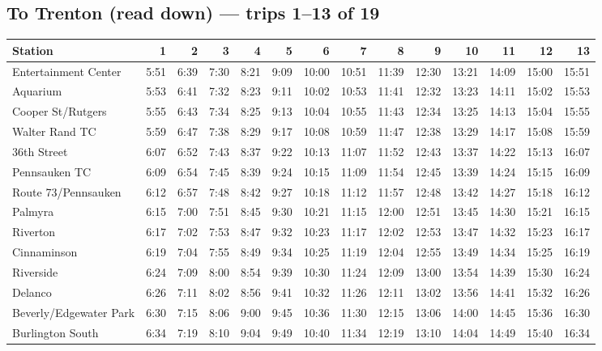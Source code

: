 \subsection*{To Trenton (read down) --- trips 1--13 of 19}
\begin{center}\footnotesize\setlength{\tabcolsep}{3pt}\begin{tabular}{@{}lrrrrrrrrrrrrr@{}}\toprule
Station & 1 & 2 & 3 & 4 & 5 & 6 & 7 & 8 & 9 & 10 & 11 & 12 & 13 \\\midrule
Entertainment Center & 5:51 & 6:39 & 7:30 & 8:21 & 9:09 & 10:00 & 10:51 & 11:39 & 12:30 & 13:21 & 14:09 & 15:00 & 15:51 \\
Aquarium & 5:53 & 6:41 & 7:32 & 8:23 & 9:11 & 10:02 & 10:53 & 11:41 & 12:32 & 13:23 & 14:11 & 15:02 & 15:53 \\
Cooper St/Rutgers & 5:55 & 6:43 & 7:34 & 8:25 & 9:13 & 10:04 & 10:55 & 11:43 & 12:34 & 13:25 & 14:13 & 15:04 & 15:55 \\
Walter Rand TC & 5:59 & 6:47 & 7:38 & 8:29 & 9:17 & 10:08 & 10:59 & 11:47 & 12:38 & 13:29 & 14:17 & 15:08 & 15:59 \\
36th Street & 6:07 & 6:52 & 7:43 & 8:37 & 9:22 & 10:13 & 11:07 & 11:52 & 12:43 & 13:37 & 14:22 & 15:13 & 16:07 \\
Pennsauken TC & 6:09 & 6:54 & 7:45 & 8:39 & 9:24 & 10:15 & 11:09 & 11:54 & 12:45 & 13:39 & 14:24 & 15:15 & 16:09 \\
Route 73/Pennsauken & 6:12 & 6:57 & 7:48 & 8:42 & 9:27 & 10:18 & 11:12 & 11:57 & 12:48 & 13:42 & 14:27 & 15:18 & 16:12 \\
Palmyra & 6:15 & 7:00 & 7:51 & 8:45 & 9:30 & 10:21 & 11:15 & 12:00 & 12:51 & 13:45 & 14:30 & 15:21 & 16:15 \\
Riverton & 6:17 & 7:02 & 7:53 & 8:47 & 9:32 & 10:23 & 11:17 & 12:02 & 12:53 & 13:47 & 14:32 & 15:23 & 16:17 \\
Cinnaminson & 6:19 & 7:04 & 7:55 & 8:49 & 9:34 & 10:25 & 11:19 & 12:04 & 12:55 & 13:49 & 14:34 & 15:25 & 16:19 \\
Riverside & 6:24 & 7:09 & 8:00 & 8:54 & 9:39 & 10:30 & 11:24 & 12:09 & 13:00 & 13:54 & 14:39 & 15:30 & 16:24 \\
Delanco & 6:26 & 7:11 & 8:02 & 8:56 & 9:41 & 10:32 & 11:26 & 12:11 & 13:02 & 13:56 & 14:41 & 15:32 & 16:26 \\
Beverly/Edgewater Park & 6:30 & 7:15 & 8:06 & 9:00 & 9:45 & 10:36 & 11:30 & 12:15 & 13:06 & 14:00 & 14:45 & 15:36 & 16:30 \\
Burlington South & 6:34 & 7:19 & 8:10 & 9:04 & 9:49 & 10:40 & 11:34 & 12:19 & 13:10 & 14:04 & 14:49 & 15:40 & 16:34 \\

\end{tabular}
\end{center}
